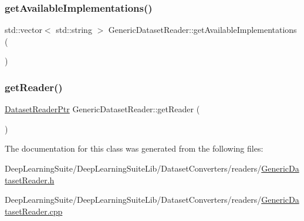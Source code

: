 \subsubsection{\texorpdfstring{get\+Available\+Implementations()}{getAvailableImplementations()}}
{\footnotesize\ttfamily std\+::vector$<$ std\+::string $>$ Generic\+Dataset\+Reader\+::get\+Available\+Implementations (\begin{DoxyParamCaption}{ }\end{DoxyParamCaption})\hspace{0.3cm}{\ttfamily [static]}}

\mbox{\label{class_generic_dataset_reader_a94efb90275d8a0bbce75cdfbbea96eae}} 
\subsubsection{\texorpdfstring{get\+Reader()}{getReader()}}
{\footnotesize\ttfamily \hyperlink{_dataset_reader_8h_a30d89cba514a220d64d04535c0465f1c}{Dataset\+Reader\+Ptr} Generic\+Dataset\+Reader\+::get\+Reader (\begin{DoxyParamCaption}{ }\end{DoxyParamCaption})}



The documentation for this class was generated from the following files\+:\begin{DoxyCompactItemize}
\item 
Deep\+Learning\+Suite/\+Deep\+Learning\+Suite\+Lib/\+Dataset\+Converters/readers/\hyperlink{_generic_dataset_reader_8h}{Generic\+Dataset\+Reader.\+h}\item 
Deep\+Learning\+Suite/\+Deep\+Learning\+Suite\+Lib/\+Dataset\+Converters/readers/\hyperlink{_generic_dataset_reader_8cpp}{Generic\+Dataset\+Reader.\+cpp}\end{DoxyCompactItemize}
